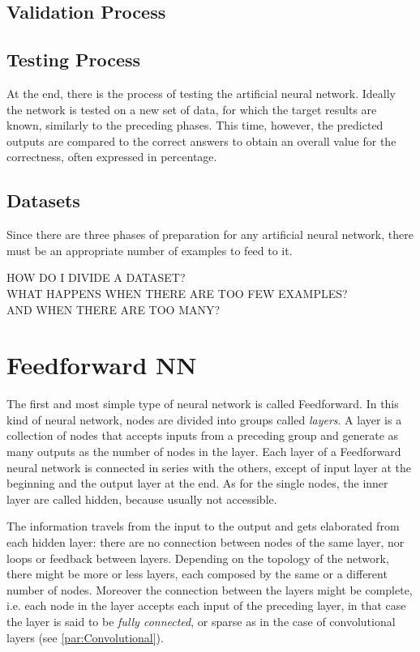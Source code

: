 \subsection{Validation Process}
\label{ssec:Validation_Process}

\subsection{Testing Process}
\label{ssec:Testing_Process}
At the end, there is the process of testing the artificial neural network.
Ideally the network is tested on a new set of data, for which the target results are known, similarly to the preceding phases.
This time, however, the predicted outputs are compared to the correct answers to obtain an overall value for the correctness, often expressed in percentage.

\subsection{Datasets}
\label{ssec:Datasets}
Since there are three phases of preparation for any artificial neural network, there must be an appropriate number of examples to feed to it.

\noindent\uppercase{\normalsize{how do i divide a dataset?\\ what happens when there are too few examples?\\ And when there are too many?}}
\normalsize

\section{Feedforward NN}
\label{sec:Feedforward_NN}

The first and most simple type of neural network is called Feedforward.
In this kind of neural network, nodes are divided into groups called \textit{layers}.
A layer is a collection of nodes that accepts inputs from a preceding group and generate as many outputs as the number of nodes in the layer.
Each layer of a Feedforward neural network is connected in series with the others, except of input layer at the beginning and the output layer at the end.
As for the single nodes, the inner layer are called hidden, because usually not accessible.

The information travels from the input to the output and gets elaborated from each hidden layer: there are no connection between nodes of the same layer, nor loops or feedback between layers.
Depending on the topology of the network, there might be more or less layers, each composed by the same or a different number of nodes.
Moreover the connection between the layers might be complete, i.e. each node in the layer accepts each input of the preceding layer, in that case the layer is said to be \textit{fully connected}, or sparse as in the case of convolutional layers (see \autoref{par:Convolutional}).

